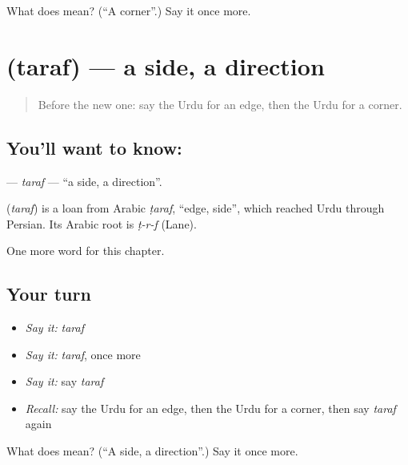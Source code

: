 \begin{tcolorbox}[breakable,colback=teal!4,colframe=teal!35!black,title={Before you move on}]
What does  mean? (\textquotedblleft{}A corner\textquotedblright{}.) Say it once more.
\end{tcolorbox}
\section[\texorpdfstring{\ur{طرف} (taraf)}{طرف (taraf)}]{ (taraf) — a side, a direction}

\label{lesson:UR-C98-taraf}



\begin{quote}
Before the new one: say the Urdu for an edge, then the Urdu for a corner.
\end{quote}

\subsection*{You'll want to know: }
\textbf{} — \emph{taraf} — \textquotedblleft{}a side, a direction\textquotedblright{}.

\begin{cousinweb}
\textbf{} (\emph{taraf}) is a loan from Arabic \emph{ṭaraf}, \textquotedblleft{}edge, side\textquotedblright{}, which reached Urdu through Persian. Its Arabic root is \emph{ṭ-r-f} (Lane).
\end{cousinweb}

\begin{grammarlens}[title={What you've built}]
One more word for this chapter.
\end{grammarlens}

\subsection*{Your turn}
\begin{itemize}
\raggedright
  \item \emph{Say it:} \emph{taraf}
  \item \emph{Say it:} \emph{taraf}, once more
  \item \emph{Say it:} say \emph{taraf}
  \item \emph{Recall:} say the Urdu for an edge, then the Urdu for a corner, then say \emph{taraf} again
\end{itemize}

\begin{tcolorbox}[breakable,colback=teal!4,colframe=teal!35!black,title={Before you move on}]
What does  mean? (\textquotedblleft{}A side, a direction\textquotedblright{}.) Say it once more.
\end{tcolorbox}
